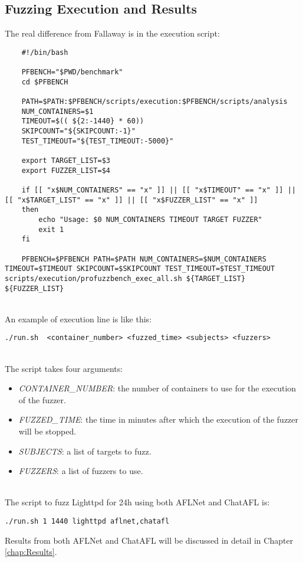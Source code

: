\subsection{Fuzzing Execution and Results}

The real difference from Fallaway is in the execution script:\\
\begin{lstlisting}
    #!/bin/bash

    PFBENCH="$PWD/benchmark"
    cd $PFBENCH

    PATH=$PATH:$PFBENCH/scripts/execution:$PFBENCH/scripts/analysis
    NUM_CONTAINERS=$1
    TIMEOUT=$(( ${2:-1440} * 60))
    SKIPCOUNT="${SKIPCOUNT:-1}"
    TEST_TIMEOUT="${TEST_TIMEOUT:-5000}"

    export TARGET_LIST=$3
    export FUZZER_LIST=$4

    if [[ "x$NUM_CONTAINERS" == "x" ]] || [[ "x$TIMEOUT" == "x" ]] || [[ "x$TARGET_LIST" == "x" ]] || [[ "x$FUZZER_LIST" == "x" ]]
    then
        echo "Usage: $0 NUM_CONTAINERS TIMEOUT TARGET FUZZER"
        exit 1
    fi

    PFBENCH=$PFBENCH PATH=$PATH NUM_CONTAINERS=$NUM_CONTAINERS TIMEOUT=$TIMEOUT SKIPCOUNT=$SKIPCOUNT TEST_TIMEOUT=$TEST_TIMEOUT scripts/execution/profuzzbench_exec_all.sh ${TARGET_LIST} ${FUZZER_LIST}
\end{lstlisting}
\phantom{}\\
An example of execution line is like this:\\
\begin{lstlisting}
./run.sh  <container_number> <fuzzed_time> <subjects> <fuzzers>
\end{lstlisting}
\phantom{}\\
The script takes four arguments:\\
\begin{itemize}
    \item \textit{CONTAINER\_NUMBER}: the number of containers to use for the execution of the fuzzer.
    \item \textit{FUZZED\_TIME}: the time in minutes after which the execution of the fuzzer will be stopped.
    \item \textit{SUBJECTS}: a list of targets to fuzz.
    \item \textit{FUZZERS}: a list of fuzzers to use.
\end{itemize}
\phantom{}\\
The script to fuzz Lighttpd for 24h using both AFLNet and ChatAFL is:
\begin{lstlisting}
./run.sh 1 1440 lighttpd aflnet,chatafl
\end{lstlisting}
Results from both AFLNet and ChatAFL will be discussed in detail in Chapter \ref{chap:Results}.